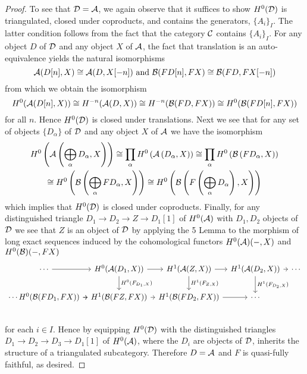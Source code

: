 \begin{proof}
  To see that \(\mathcal{D} = \mathcal{A}\), we again observe that it suffices to show \(H^0(\mathcal{D})\) is triangulated, closed under coproducts, and contains the generators, \(\{A_i\}_I\).
  The latter condition follows from the fact that the category \(\mathcal{C}\) contains \(\{A_i\}_I\).
  For any object \(D\) of \(\mathcal{D}\) and any object \(X\) of \(\mathcal{A}\), the fact that translation is an auto-equivalence yields the natural isomorphisms
  \[\A(D[n], X) \cong \A(D, X[-n])\ \text{and}\ \B(FD[n], FX) \cong \B(FD, FX[-n])\]
  from which we obtain the isomorphism
  \[H^0(\mathcal{A}(D[n], X)) \cong H^{-n}(\mathcal{A}(D,X)) \cong H^{-n}(\mathcal{B}(FD, FX)) \cong H^0(\mathcal{B}(FD[n], FX))\]
  for all \(n\).
  Hence \(H^0(\mathcal{D})\) is closed under translations.
  Next we see that for any set of objects \(\{D_\alpha\}\) of \(\mathcal{D}\) and any object \(X\) of \(\mathcal{A}\) we have the isomorphism
  \begin{gather*}
    H^0\left(\mathcal{A}\left(\bigoplus_\alpha D_\alpha, X\right)\right)
  \cong \prod_\alpha H^0\left(\mathcal{A}\left(D_\alpha, X\right)\right)
    \cong \prod_\alpha H^0\left(\mathcal{B}\left(FD_\alpha, X\right)\right)\\
    \cong H^0\left(\mathcal{B}\left(\bigoplus_\alpha FD_\alpha, X\right)\right)
    \cong H^0\left(\mathcal{B}\left(F\left(\bigoplus_\alpha D_\alpha\right), X\right)\right)
  \end{gather*}
  which implies that \(H^0(\mathcal{D})\) is closed under coproducts.
  Finally, for any distinguished triangle \(D_1 \to D_2 \to Z \to D_1[1]\) of \(H^0(\mathcal{A})\) with \(D_1, D_2\) objects of \(\mathcal{D}\) we see that \(Z\) is an object of \(\mathcal{D}\) by applying the 5 Lemma to the morphism of long exact sequences induced by the cohomological functors \(H^0(\mathcal{A})(-, X)\) and \(H^0(\mathcal{B})(-, FX)\)
  \[\begin{tikzcd}[column sep=tiny]
  \cdots \arrow{r} & H^0(\A(D_1, X)) \arrow{r}\arrow{d}{H^0(F_{D_1,X})} & H^1(\A(Z, X)) \arrow{r}\arrow{d}{H^1(F_{Z,X})} & H^1(\A(D_2, X)) \arrow{r}\arrow{d}{H^1(F_{D_2,X})} & \cdots\\
  \cdots \arrow{r} H^0(\B(FD_1, FX)) \arrow{r} & H^1(\B(FZ, FX)) \arrow{r} & H^1(\B(FD_2, FX)) \arrow{r}& \cdots\\
  \end{tikzcd}\]
  for each \(i \in I\).
  Hence by equipping \(H^0(\mathcal{D})\) with the distinguished triangles \(D_1 \to D_2 \to D_3 \to D_1[1]\) of \(H^0(\mathcal{A})\), where the \(D_i\) are objects of \(\mathcal{D}\), inherits the structure of a triangulated subcategory.
  Therefore \(D = \mathcal{A}\) and \(F\) is quasi-fully faithful, as desired.
\end{proof}
